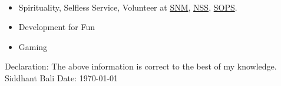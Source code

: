 \documentclass[10pt]{extarticle}
\newcommand{\yourname}{Siddhant Bali}%
\begin{document}
\begin{contained}\\
\begin{itemize}
    \setlength\itemsep{0.5pt}
    \item Spirituality, Selfless Service, Volunteer at \href{https://www.nirankari.org/}{SNM},
    \href{https://nss.gov.in/}{NSS},
    \href{https://sops.in/}{SOPS}.
    \item Development for Fun
    \item Gaming
\end{itemize}
\end{contained}
Declaration: The above information is correct to the best of my knowledge.\newline
\yourname\newline
Date: \today
\end{document}
